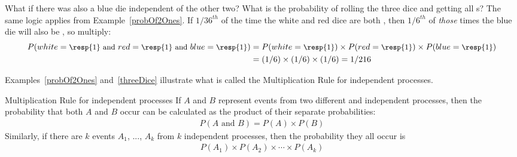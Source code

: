 \begin{examplewrap}
\begin{nexample}{What if there was also a blue die independent of the other two? What is the probability of rolling the three dice and getting all s?}\label{threeDice}
The same logic applies from Example~\ref{probOf2Ones}. If $1/36^{th}$ of the time the white and red dice are both , then $1/6^{th}$ of \emph{those} times the blue die will also be , so multiply:
{\begin{align*}
P(white=\text{\small\resp{1} and } red=\text{\small\resp{1} and } blue=\text{\small\resp{1}})
	&= P(white=\text{\small\resp{1}})\times P(red=\text{\small\resp{1}})\times P(blue=\text{\small\resp{1}}) \\
	&= (1/6)\times (1/6)\times (1/6)
	= 1/216
\end{align*}} \vspace{-7mm}
\end{nexample}
\end{examplewrap}

Examples~\ref{probOf2Ones} and~\ref{threeDice} illustrate what is called the Multiplication Rule for independent processes.

\begin{onebox}{Multiplication Rule for independent processes}
If $A$ and $B$ represent events from two different and independent processes, then the probability that both $A$ and $B$ occur can be calculated as the product of their separate probabilities: \vspace{-1.5mm}
\begin{eqnarray*}\label{eqForIndependentEvents}
P(A \text{ and }B) = P(A) \times  P(B)
\end{eqnarray*}
Similarly, if there are $k$ events $A_1$, ..., $A_k$ from $k$ independent processes, then the probability they all occur is\vspace{-1.5mm}
\begin{eqnarray*}
P(A_1) \times  P(A_2)\times  \cdots \times  P(A_k)
\end{eqnarray*}\vspace{-6mm}\end{onebox}

